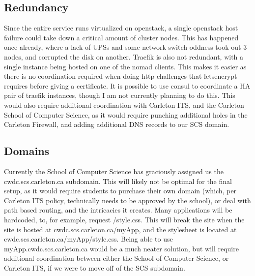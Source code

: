 \documentclass{article}
\begin{document}
\subsection{Redundancy}
Since the entire service runs virtualized on openstack, a single openstack host failure could take down a critical amount of cluster nodes. This has happened once already, where a lack of UPSs and some network switch oddness took out 3 nodes, and corrupted the disk on another. Traefik is also not redundant, with a single instance being hosted on one of the nomad clients. This makes it easier as there is no coordination required when doing http challenges that letsencrypt requires before giving a certificate. It is possible to use consul to coordinate a HA pair of traefik instances, though I am not currently planning to do this. This would also require additional coordination with Carleton ITS, and the Carleton School of Computer Science, as it would require punching additional holes in the Carleton Firewall, and adding additional DNS records to our SCS domain.
\subsection{Domains}
Currently the School of Computer Science has graciously assigned us the cwdc.scs.carleton.ca subdomain. This will likely not be optimal for the final setup, as it would require students to purchase their own domain (which, per Carleton ITS policy, technically needs to be approved by the school), or deal with path based routing, and the intricacies it creates. Many applications will be hardcoded, to, for example, request /style.css. This will break the site when the site is hosted at cwdc.scs.carleton.ca/myApp, and the stylesheet is located at cwdc.scs.carleton.ca/myApp/style.css. Being able to use myApp.cwdc.scs.carleton.ca would be a much neater solution, but will require additional coordination between either the School of Computer Science, or Carleton ITS, if we were to move off of the SCS subdomain.
\end{document}
